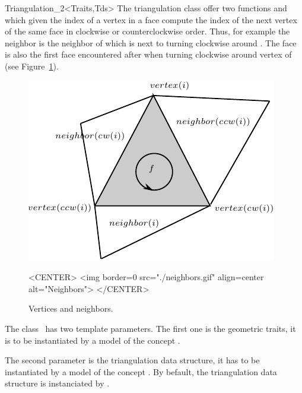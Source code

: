 \begin{ccRefClass}{Triangulation_2<Traits,Tds>}
The triangulation class
offer  two functions  and 
which given the index of a vertex in a face
compute the index of the next vertex  of the same face
in clockwise
or counterclockwise order.
 Thus, for example the neighbor 
 is
 the
neighbor of   which is next to  turning clockwise
around . The face 
is also the first face encountered after  when
turning clockwise around vertex 
of~ (see Figure~\ref{Triangulation_ref_Fig_neighbors}).



 \begin{figure}
\begin{ccTexOnly}
    \begin{center}
     \includegraphics{Triangulation_2/neighbors}
    \end{center}
\end{ccTexOnly} 
    \caption{Vertices and neighbors.
    \label{Triangulation_ref_Fig_neighbors}}
  \begin{ccHtmlOnly}
<CENTER>
<img border=0 src="./neighbors.gif" align=center alt="Neighbors">
</CENTER>
\end{ccHtmlOnly} 
\end{figure}




\ccParameters
The class \ccRefName\ has  two template parameters. The first one
 is the geometric traits, it is to be instantiated by
 a model of the concept .

The second parameter is the triangulation data structure,
it has to be instantiated by a model of the concept
.
By befault, the triangulation data structure  is instanciated by
.



\end{ccRefClass}
